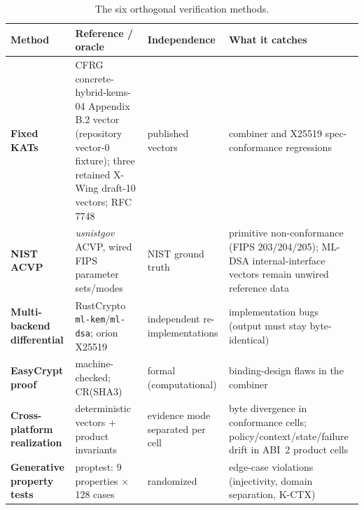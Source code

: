 \documentclass[journal]{IEEEtran}
\newcommand{\code}[1]{\texttt{\small #1}}
\begin{document}
\begin{table}[t]\centering\footnotesize
\setlength{\tabcolsep}{6pt}\renewcommand{\arraystretch}{1.2}
\caption{The six orthogonal verification methods.}\label{tab:verif}
\begin{tabular}{@{}>{\bfseries}l p{3.4cm} p{2.6cm} p{6.6cm}@{}}
\toprule
\textbf{Method} & \textbf{Reference / oracle} & \textbf{Independence} & \textbf{What it catches} \\
\midrule
Fixed KATs & CFRG concrete-hybrid-kems-04 Appendix B.2 vector (repository vector-0 fixture); three retained X-Wing draft-10 vectors; RFC 7748 & published vectors & combiner and X25519 spec-conformance regressions \\
NIST ACVP & \emph{usnistgov} ACVP, wired FIPS parameter sets/modes & NIST ground truth & primitive non-conformance (FIPS 203/204/205); ML-DSA internal-interface vectors remain unwired reference data \\
Multi-backend differential & RustCrypto \code{ml-kem}/\code{ml-dsa}; orion X25519 & independent re-implementations & implementation bugs (output must stay byte-identical) \\
EasyCrypt proof & machine-checked; CR(SHA3) & formal (computational) & binding-design flaws in the combiner \\
Cross-platform realization & deterministic vectors $+$ product invariants & evidence mode separated per cell & byte divergence in conformance cells; policy/context/state/failure drift in ABI~2 product cells \\
Generative property tests & proptest: 9 properties $\times$ 128 cases & randomized & edge-case violations (injectivity, domain separation, K-CTX) \\
\bottomrule
\end{tabular}
\end{table}
\end{document}
